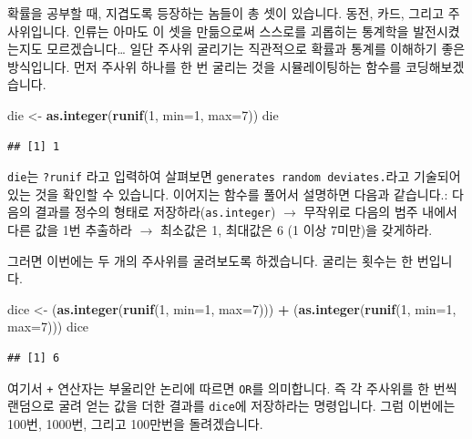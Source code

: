 \documentclass[]{book}
\newenvironment{Shaded}{\begin{snugshade}}{\end{snugshade}}
\newcommand{\DataTypeTok}[1]{\textcolor[rgb]{0.13,0.29,0.53}{#1}}
\newcommand{\DecValTok}[1]{\textcolor[rgb]{0.00,0.00,0.81}{#1}}
\newcommand{\KeywordTok}[1]{\textcolor[rgb]{0.13,0.29,0.53}{\textbf{#1}}}
\newcommand{\NormalTok}[1]{#1}
\newcommand{\OperatorTok}[1]{\textcolor[rgb]{0.81,0.36,0.00}{\textbf{#1}}}
\newcommand{\StringTok}[1]{\textcolor[rgb]{0.31,0.60,0.02}{#1}}
\begin{document}
확률을 공부할 때, 지겹도록 등장하는 놈들이 총 셋이 있습니다. 동전, 카드, 그리고 주사위입니다. 인류는 아마도 이 셋을 만듦으로써 스스로를 괴롭히는 통계학을 발전시켰는지도 모르겠습니다\ldots{} 일단 주사위 굴리기는 직관적으로 확률과 통계를 이해하기 좋은 방식입니다. 먼저 주사위 하나를 한 번 굴리는 것을 시뮬레이팅하는 함수를 코딩해보겠습니다.

\begin{Shaded}
\begin{Highlighting}[]
\NormalTok{die <-}\StringTok{ }\KeywordTok{as.integer}\NormalTok{(}\KeywordTok{runif}\NormalTok{(}\DecValTok{1}\NormalTok{, }\DataTypeTok{min=}\DecValTok{1}\NormalTok{, }\DataTypeTok{max=}\DecValTok{7}\NormalTok{))}
\NormalTok{die}
\end{Highlighting}
\end{Shaded}

\begin{verbatim}
## [1] 1
\end{verbatim}

\texttt{die}는 \texttt{?runif} 라고 입력하여 살펴보면 \texttt{generates\ random\ deviates.}라고 기술되어 있는 것을 확인할 수 있습니다. 이어지는 함수를 풀어서 설명하면 다음과 같습니다.: 다음의 결과를 정수의 형태로 저장하라(\texttt{as.integer}) \(\rightarrow\) 무작위로 다음의 범주 내에서 다른 값을 1번 추출하라 \(\rightarrow\) 최소값은 1, 최대값은 6 (1 이상 7미만)을 갖게하라.

그러면 이번에는 두 개의 주사위를 굴려보도록 하겠습니다. 굴리는 횟수는 한 번입니다.

\begin{Shaded}
\begin{Highlighting}[]
\NormalTok{dice <-}\StringTok{ }\NormalTok{(}\KeywordTok{as.integer}\NormalTok{(}\KeywordTok{runif}\NormalTok{(}\DecValTok{1}\NormalTok{, }\DataTypeTok{min=}\DecValTok{1}\NormalTok{, }\DataTypeTok{max=}\DecValTok{7}\NormalTok{))) }\OperatorTok{+}
\StringTok{  }\NormalTok{(}\KeywordTok{as.integer}\NormalTok{(}\KeywordTok{runif}\NormalTok{(}\DecValTok{1}\NormalTok{, }\DataTypeTok{min=}\DecValTok{1}\NormalTok{, }\DataTypeTok{max=}\DecValTok{7}\NormalTok{)))}
\NormalTok{dice}
\end{Highlighting}
\end{Shaded}

\begin{verbatim}
## [1] 6
\end{verbatim}

여기서 \texttt{+} 연산자는 부울리안 논리에 따르면 \texttt{OR}를 의미합니다. 즉 각 주사위를 한 번씩 랜덤으로 굴려 얻는 값을 더한 결과를 \texttt{dice}에 저장하라는 명령입니다. 그럼 이번에는 100번, 1000번, 그리고 100만번을 돌려겠습니다.
\end{document}
